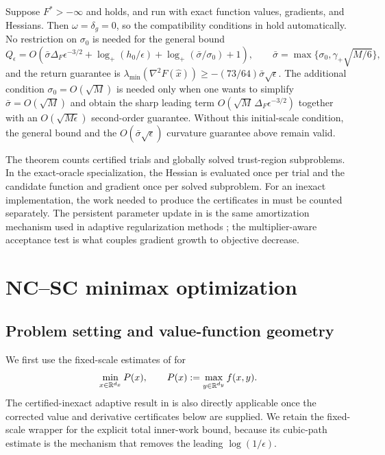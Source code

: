 \documentclass{article}
\begin{document}
\begin{remark}
\label{rem:exact-oracle-overhead}
Suppose $F^*>-\infty$ and  holds, and run
 with exact function values, gradients, and
Hessians.  Then $\omega=\delta_g=0$, so the compatibility conditions in
 hold automatically.  No restriction
on $\sigma_0$ is needed for the general bound
\begin{equation}\label{eq:big-O-complexity}
 Q_\epsilon=O\!\left(
  \bar\sigma\Delta_F\epsilon^{-3/2}
  +\log_+(h_0/\epsilon)
  +\log_+(\bar\sigma/\sigma_0)+1
 \right),
 \qquad
 \bar\sigma=\max\{\sigma_0,\gamma_+\sqrt{M/6}\},
\end{equation}
and the return guarantee is
$\lambda_{\min}(\nabla^2F(\widehat x))
\ge-(73/64)\bar\sigma\sqrt\epsilon$.
The additional condition $\sigma_0=O(\sqrt M)$ is needed only when
one wants to simplify $\bar\sigma=O(\sqrt M)$ and obtain the sharp
leading term $O(\sqrt M\,\Delta_F\epsilon^{-3/2})$ together with an
$O(\sqrt{M\epsilon})$ second-order guarantee.  Without this
initial-scale condition, the general bound and the
$O(\bar\sigma\sqrt\epsilon)$ curvature guarantee above remain valid.
\end{remark}

The theorem counts certified trials and globally solved trust-region
subproblems.  In the exact-oracle specialization, the Hessian is evaluated
once per trial and the candidate function and gradient once per solved
subproblem.  For an inexact implementation, the work needed to produce
the certificates in  must be counted
separately.
The persistent
parameter update in  is the same amortization
mechanism used in adaptive regularization methods
\citep{cartis2011adaptive2}; the multiplier-aware acceptance test is
what couples gradient growth to objective decrease.

\section{NC--SC minimax optimization}\label{sec:ncsc}

\subsection{Problem setting and value-function geometry}

We first use the fixed-scale estimates of  for
\begin{equation}\label{eq:ncsc-problem}
 \min_{x\in\mathbb{R}^{d_x}}P(x),
 \qquad
 P(x):=\max_{y\in\mathbb{R}^{d_y}}f(x,y).
\end{equation}
The certified-inexact adaptive result in
 is also directly applicable once the
corrected value and derivative certificates below are supplied.  We
retain the fixed-scale wrapper for the explicit total inner-work bound,
because its cubic-path estimate is the mechanism that removes the
leading $\log(1/\epsilon)$.
\end{document}

